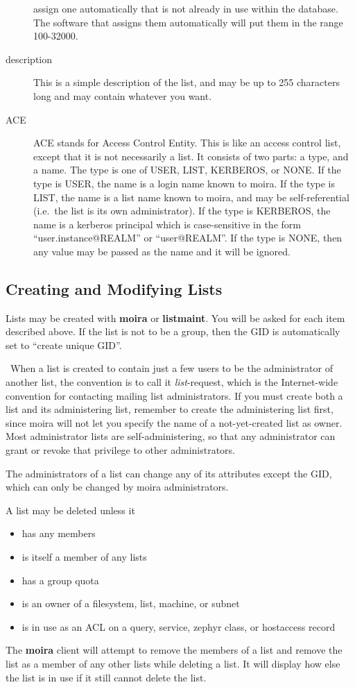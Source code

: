 \documentclass{book}
\begin{document}
\begin{description}
assign one automatically that is not already in use within the
database.  The software that assigns them automatically will put them
in the range 100-32000.
\item[description] This is a simple description of the list, and may be up
to 255 characters long and may contain whatever you want.
\item[ACE] ACE stands for Access Control Entity.  This is like an access
control list, except that it is not necessarily a list.  It consists
of two parts: a type, and a name.  The type is one of USER, LIST,
KERBEROS, or NONE.  If the type is USER, the name is a login name
known to moira.  If the type is LIST, the name is a list name known to
moira, and may be self-referential (i.e.\ the list is its own
administrator).   If the type is KERBEROS, the name is
a kerberos principal which is case-sensitive in the form
``user.instance@REALM'' or ``user@REALM''.  If the type is NONE,
then any value may be passed as the name and it will be ignored.
\end{description}

\subsection{Creating and Modifying Lists}

Lists may be created with {\bf moira} or {\bf listmaint}.  You will be
asked for each item described above.  If the list is not to be a
group, then the GID is automatically set to ``create unique GID''.

\athena\ When a list is created to contain just a few users to be the
administrator of another list, the convention is to call it
{\em list}-request, which is the Internet-wide convention for contacting
mailing list administrators.  If you must create both a list and its
administering list, remember to create the administering list first,
since moira will not let you specify the name of a not-yet-created
list as owner.  Most administrator lists are self-administering, so
that any administrator can grant or revoke that privilege to other
administrators. 

The administrators of a list can change any of its attributes except
the GID, which can only be changed by moira administrators.

A list may be deleted unless it
\begin{itemize}
\item has any members
\item is itself a member of any lists
\item has a group quota
\item is an owner of a filesystem, list, machine, or subnet
\item is in use as an ACL on a query, service, zephyr class, or
hostaccess record
\end{itemize}
The {\bf moira} client will attempt to remove the members of a list and
remove the list as a member of any other lists while deleting a list.
It will display how else the list is in use if it still cannot delete
the list.
\end{document}
